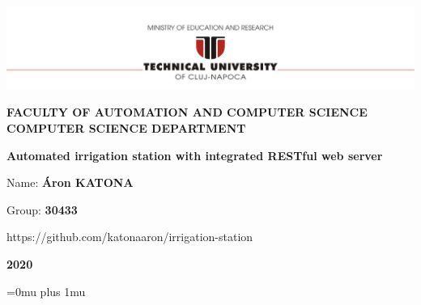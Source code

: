 \documentclass[12pt,a4paper,twoside]{report}
\renewcommand{\thesisauthor}{Áron KATONA}    %
\newcommand{\thesisauthorgroup}{30433}    %
\renewcommand{\thesisyear}{2020}      %
\renewcommand{\thesistitle}{Automated irrigation station with integrated RESTful web server}
\newcommand{\department}{\bf FACULTY OF AUTOMATION AND COMPUTER SCIENCE\\
COMPUTER SCIENCE DEPARTMENT}
\newcommand{\utcnlogo}{\includegraphics[width=15cm]{img/tucn.jpg}}
\begin{document}

\newenvironment{definition}[1][Defini\c{t}ie.]{\begin{trivlist}
\item[\hskip \labelsep {\bfseries #1}]}{\end{trivlist}}





\begin{center}
\utcnlogo

\department

\vspace{4cm}

{\bf \thesistitle} %

\vspace{1.5cm}


\vspace{6cm}

Name: {\bf \thesisauthor} 

Group: {\bf \thesisauthorgroup}

\vspace{1cm}

https://github.com/katonaaron/irrigation-station

\vspace{2cm}
{\bf \thesisyear}
\end{center}

\thispagestyle{empty}
\newpage

\setcounter{page}{1}



\tableofcontents
\newpage

\setcounter{page}{1}
\pagestyle{headings}

 






\Urlmuskip=0mu plus 1mu
 
\end{document}

